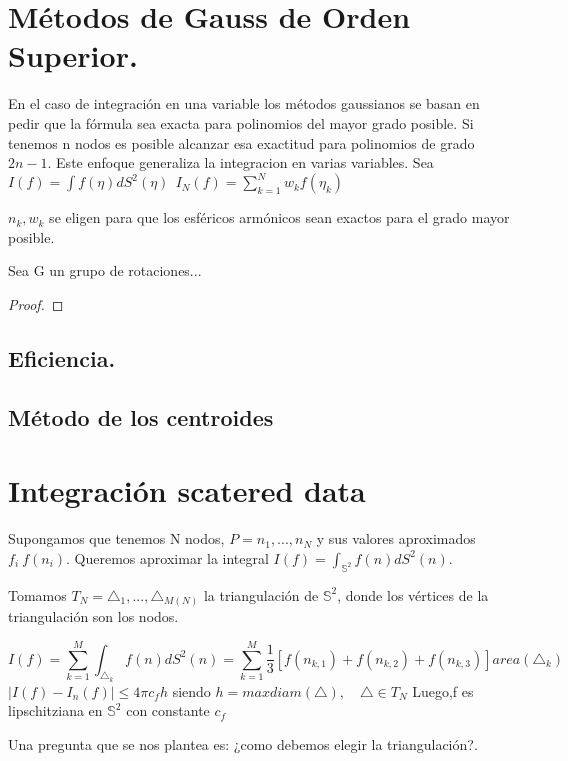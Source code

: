 \section{Métodos de Gauss de Orden Superior.}
En el caso de integración en una variable los métodos gaussianos se basan en pedir que la fórmula sea exacta para polinomios del mayor grado posible. Si tenemos n nodos es posible alcanzar esa exactitud para polinomios de grado $2n-1$. Este enfoque generaliza la integracion en varias variables. Sea $I(f)= \int f(\eta)dS^2(\eta) ~~ I_N(f) = \sum_{k=1}^{N} w_kf(\eta_k)$

${n_k},{w_k}$ se eligen para que los esféricos armónicos sean exactos para el grado mayor posible.

\begin{thm}
	Sea G un grupo de rotaciones...
\end{thm}
\begin{proof}
\end{proof}

\subsection{Eficiencia.}

\subsection{Método de los centroides}

\section{Integración scatered data}
Supongamos que tenemos N nodos, $P={n_1,...,n_N}$ y sus valores aproximados $f_i~f(n_i)$. Queremos aproximar la integral $I(f) =  \int_{\mathds{S}^2} f(n)dS^2(n)$.

\medskip
Tomamos $T_N={\triangle_1,...,\triangle_{M(N)}}$ la triangulación de $\mathds{S}^2$, donde los vértices de la triangulación son los nodos.

$$
I(f) = \sum_{k=1}^{M} \int_{\triangle_k} f(n)dS^2(n) =  \sum_{k=1}^{M} \frac{1}{3}[f(n_{k,1})+f(n_{k,2})+f(n_{k,3})] area(\triangle_k)
$$
$|I(f)-I_n(f)|\le 4\pi c_f h$ siendo $h=max diam(\triangle), \quad \triangle\in T_N$
Luego,f es lipschitziana en $\mathds{S}^2$ con constante $ c_f$

Una pregunta que se nos plantea es: ¿como debemos elegir la triangulación?.
